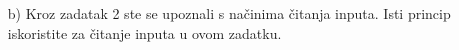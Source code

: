 \documentclass{exam}
\begin{document}
\begin{itemize}
                                                                                                                            \item[b)]
                                                                                                                                Kroz
                                                                                                                                zadatak
                                                                                                                                2
                                                                                                                                ste
                                                                                                                                se
                                                                                                                                upoznali
                                                                                                                                s
                                                                                                                                načinima
                                                                                                                                čitanja
                                                                                                                                inputa.
                                                                                                                                Isti
                                                                                                                                princip
                                                                                                                                iskoristite
                                                                                                                                za
                                                                                                                                čitanje
                                                                                                                                inputa
                                                                                                                                u
                                                                                                                                ovom
                                                                                                                                zadatku.

\end{itemize}
\end{document}
